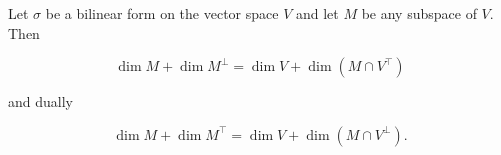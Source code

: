 Let $\sigma$ be a bilinear form on the vector space $V$ and let $M$ be any subspace of $V$. Then

$$\dim M + \dim M^{\perp} = \dim V + \dim(M \cap V^{\top})$$

and dually

$$\dim M + \dim M^{\top} = \dim V + \dim(M \cap V^{\perp}).$$
